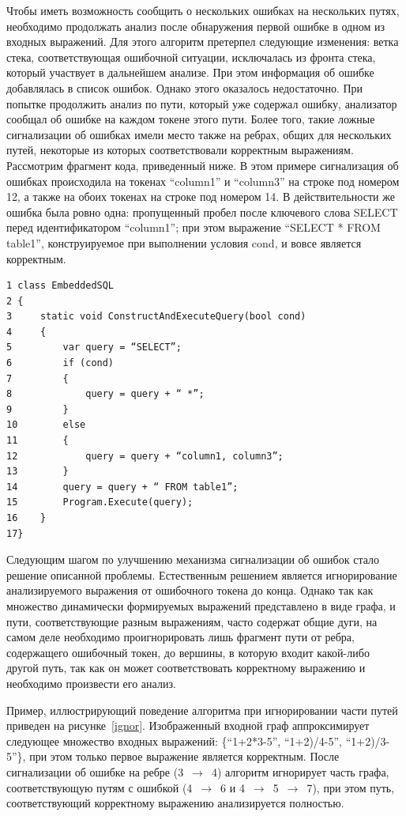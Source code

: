Чтобы иметь возможность сообщить о нескольких ошибках на нескольких путях, 
необходимо продолжать анализ после обнаружения первой ошибке в одном из входных 
выражений. Для этого алгоритм претерпел следующие изменения: ветка стека, 
соответствующая ошибочной ситуации, исключалась из фронта стека, который участвует 
в дальнейшем анализе. При этом информация об ошибке добавлялась в список ошибок. 
Однако этого оказалось недостаточно. При попытке продолжить анализ по пути, 
который уже содержал ошибку, анализатор сообщал об ошибке на каждом токене этого 
пути. Более того, такие ложные сигнализации об ошибках имели место также на ребрах, 
общих для нескольких путей, некоторые из которых соответствовали корректным 
выражениям. Рассмотрим фрагмент кода, приведенный ниже. В этом примере сигнализация
об ошибках происходила на токенах “column1” 
и “column3” на строке под номером 12, а также на обоих токенах на строке под 
номером 14. В действительности же ошибка была ровно одна: пропущенный пробел после 
ключевого слова SELECT перед идентификатором “column1”; при этом выражение “SELECT 
* FROM table1”, конструируемое при выполнении условия cond, и вовсе является 
корректным.

\begin{verbatim}
1 class EmbeddedSQL 
2 {
3     static void ConstructAndExecuteQuery(bool cond)
4     {
5         var query = “SELECT”;
6         if (cond)
7         {
8             query = query + “ *”; 
9         }
10        else
11        {
12            query = query + “column1, column3”;
13        }
14        query = query + “ FROM table1”;
15        Program.Execute(query);
16    }
17}
\end{verbatim}

Следующим шагом по улучшению механизма сигнализации об ошибок стало решение 
описанной проблемы. Естественным решением является игнорирование анализируемого 
выражения от ошибочного токена до конца. Однако так как множество динамически 
формируемых выражений представлено в виде графа, и пути, соответствующие разным 
выражениям, часто содержат общие дуги, на самом деле необходимо проигнорировать 
лишь фрагмент пути от ребра, содержащего ошибочный токен, до вершины, в которую 
входит какой-либо другой путь, так как он может соответствовать корректному 
выражению и необходимо произвести его анализ.

Пример, иллюстрирующий поведение алгоритма при игнорировании части путей приведен 
на рисунке~\ref{ignor}. Изображенный входной граф аппроксимирует следующее множество входных 
выражений: \{“1+2*3-5”, “1+2)/4-5”, “1+2)/3-5”\}, при этом только первое выражение 
является корректным. После сигнализации об ошибке на ребре (3~$\to$~4) алгоритм 
игнорирует часть графа, соответствующую путям с ошибкой (4~$\to$~6 и 4~$\to$~5~$\to$~7), 
при этом путь, соответствующий корректному выражению анализируется полностью.

